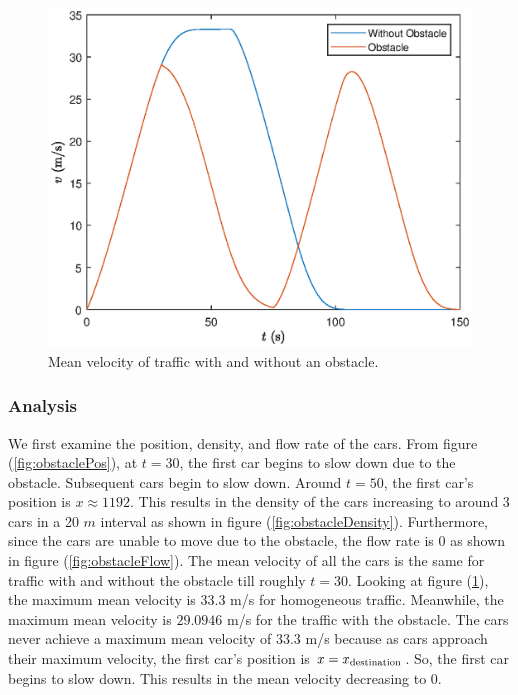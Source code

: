 \documentclass[12pt]{article}
\begin{document}
    \begin{figure}[H]
      \includegraphics[width=13cm]{BottleNeck7.eps}
      \centering
      \caption{Mean velocity of traffic with and without an obstacle.}
      \label{fig:obstacleMean}
      \end{figure}

    \subsubsection{Analysis}
    We first examine the position, density, and flow rate of the cars. From figure (\ref{fig:obstaclePos}), at $t=30$, the first car begins to slow down due to the obstacle. Subsequent cars begin to slow down. Around $t=50$, the first car's position is $x\approx 1192$. This results in the density of the cars increasing to around $3$ cars in a 20 $m$ interval as shown in figure (\ref{fig:obstacleDensity}). Furthermore, since the cars are unable to move due to the obstacle, the flow rate is $0$ as shown in figure (\ref{fig:obstacleFlow}). The mean velocity of all the cars is the same for traffic with and without the obstacle till roughly $t=30$. Looking at figure (\ref{fig:obstacleMean}), the maximum mean velocity is $33.3$ m/s for homogeneous traffic. Meanwhile, the maximum mean velocity is $29.0946$ m/s for the traffic with the obstacle. The cars never achieve a maximum mean velocity of $33.3$ m/s because as cars approach their maximum velocity, the first car's position is $x = x_{\rm destination}$. So, the first car begins to slow down. This results in the mean velocity  decreasing to $0$. 
\end{document}
